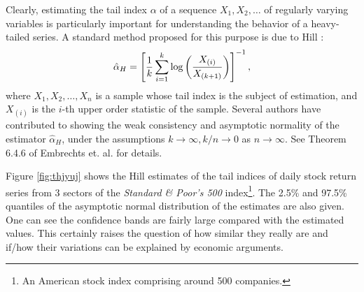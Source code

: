 Clearly, estimating the tail index $\alpha$ of a sequence
$X_1, X_2, \dots$ of regularly varying variables is particularly
important for understanding the behavior of a heavy-tailed series. A
standard method proposed for this purpose is due to Hill
\cite{hill1975simple}:
\begin{equation}
  \label{eq:fhhty}
  \hat \alpha_H = \left[
    {1 \over k} \sum_{i=1}^k \log \left(
      X_{(i)} \over X_{(k+1)}
    \right)
  \right]^{-1},
\end{equation}
where $X_1, X_2, \dots, X_n$ is a sample whose tail index is the
subject of estimation, and $X_{(i)}$ is the $i$-th upper order
statistic of the sample. Several authors have contributed to showing
the weak consistency and asymptotic normality of the estimator
$\hat \alpha_H$, under the assumptions $k \to \infty, k/n \to 0$
as $n \to \infty$. See Theorem 6.4.6 of Embrechts et. al.
\cite{embrechts:klueppelberg:mikosch:1997} for details.


Figure \ref{fig:thjyuj} shows the Hill estimates of the tail indices
of daily stock return series from 3 sectors of the
{\em Standard \& Poor's 500} index\footnote{An American stock index
  comprising around 500 companies.}. The 2.5\% and 97.5\% quantiles of
the asymptotic normal distribution of the estimates are also
given. One can see the confidence bands are fairly large compared with
the estimated values. This certainly raises the question of how
similar they really are and if/how their variations can be explained by
economic arguments.



